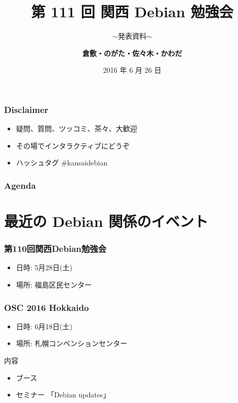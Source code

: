 \documentclass[cjk,dvipdfmx,10pt,compress,%
hyperref={bookmarks=true,bookmarksnumbered=true,bookmarksopen=false,%
colorlinks=false,%
pdftitle={第 111 回 関西 Debian 勉強会},%
pdfauthor={倉敷・のがた・佐々木・かわだ},%
pdfsubject={資料},%
}]{beamer}
\title{第 111 回 関西 Debian 勉強会}
\subtitle{$\sim$発表資料$\sim$}
\author[かわだ てつたろう]{{\large\bf 倉敷・のがた・佐々木・かわだ}}
\institute[Debian JP]{{\normalsize\tt 関西 Debian 勉強会}}
\date{{\small 2016 年 6 月 26 日}}
\begin{document}
\settitleslide
\begin{frame}
\titlepage
\end{frame}
\setdefaultslide

\begin{frame}[fragile]
  \frametitle{Disclaimer}
  \begin{itemize}
  \item 疑問、質問、ツッコミ、茶々、\alert{大歓迎}
  \item その場でインタラクティブにどうぞ
  \item ハッシュタグ \#kansaidebian
  \end{itemize}
\end{frame}

\begin{frame}[fragile]
\frametitle{Agenda}

\tableofcontents

\end{frame}

\section{最近の Debian 関係のイベント}

\begin{frame}[fragile]
  \frametitle{第110回関西Debian勉強会}
  \begin{itemize}
  \item 日時: 5月28日(土)
  \item 場所: 福島区民センター
  \end{itemize}
\end{frame}

\begin{frame}[fragile]
  \frametitle{OSC 2016 Hokkaido}
  \begin{itemize}
  \item 日時: 6月18日(土)
  \item 場所: 札幌コンベンションセンター
  \end{itemize}
  \begin{block}{内容}
    \begin{itemize}
    \item ブース
    \item セミナー 「Debian updates」
    \end{itemize}
  \end{block}
\end{frame}
\end{document}
